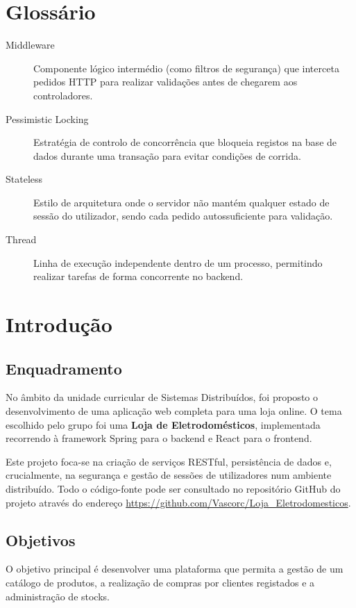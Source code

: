 \documentclass[11pt,a4paper,oneside]{report}
\begin{document}
\chapter*{Glossário}
\begin{description}
    \item[Middleware] Componente lógico intermédio (como filtros de segurança) que interceta pedidos HTTP para realizar validações antes de chegarem aos controladores.
    \item[Pessimistic Locking] Estratégia de controlo de concorrência que bloqueia registos na base de dados durante uma transação para evitar condições de corrida.
    \item[Stateless] Estilo de arquitetura onde o servidor não mantém qualquer estado de sessão do utilizador, sendo cada pedido autossuficiente para validação.
    \item[Thread] Linha de execução independente dentro de um processo, permitindo realizar tarefas de forma concorrente no backend.
\end{description}


\chapter{Introdução}

\section{Enquadramento}
No âmbito da unidade curricular de Sistemas Distribuídos, foi proposto o desenvolvimento de uma aplicação web completa para uma loja online. O tema escolhido pelo grupo foi uma \textbf{Loja de Eletrodomésticos}, implementada recorrendo à framework Spring para o backend e React para o frontend.

Este projeto foca-se na criação de serviços RESTful, persistência de dados e, crucialmente, na segurança e gestão de sessões de utilizadores num ambiente distribuído. Todo o código-fonte pode ser consultado no repositório GitHub do projeto através do endereço \url{https://github.com/Vascorc/Loja_Eletrodomesticos}.

\section{Objetivos}
O objetivo principal é desenvolver uma plataforma que permita a gestão de um catálogo de produtos, a realização de compras por clientes registados e a administração de stocks.
\end{document}
